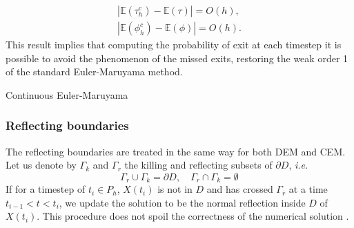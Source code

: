 \begin{align}\label{eq:ConvCEMPhi}
	|\mathbb{E}(\tau_h^c) - \mathbb{E}(\tau)| = O(h), \\
	|\mathbb{E}(\phi_h^c) - \mathbb{E}(\phi)| = O(h).
\end{align}
This result implies that computing the probability of exit at each timestep it is possible to avoid the phenomenon of the missed exits, restoring the weak order 1 of the standard Euler-Maruyama method.

\begin{algorithm}[t]
\caption{Continuous Euler-Maruyama}
\label{alg:algoCEM}
\end{algorithm}



\subsubsection{Reflecting boundaries}
The reflecting boundaries are treated in the same way for both DEM and CEM. Let us denote by $\Gamma_k$ and $\Gamma_r$ the killing and reflecting subsets of $\partial D$, \textit{i.e.}
\begin{equation}\label{eq:Boundaries}
	\Gamma_r \cup \Gamma_k = \partial D, \quad \Gamma_r \cap \Gamma_k = \emptyset
\end{equation} 
If for a timestep of $t_i \in P_h$, $X(t_i)$ is not in $D$ and has crossed $\Gamma_r$ at a time $t_{i-1} < t < t_i$, we update the solution to be the normal reflection inside $D$ of $X(t_i)$. This procedure does not spoil the correctness of the numerical solution \cite{Helmuth}.



